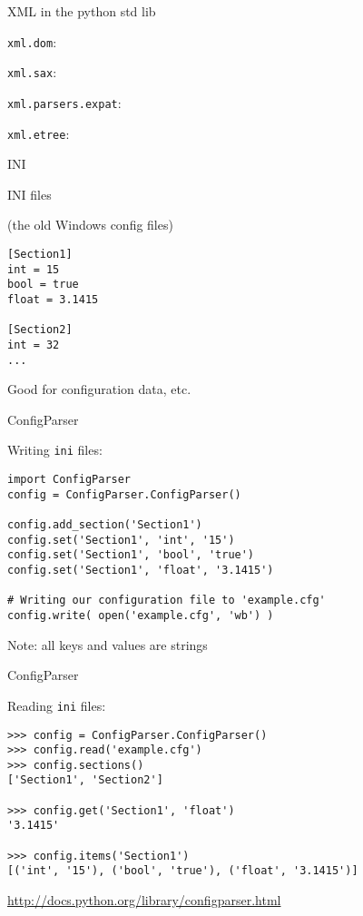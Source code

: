 \documentclass{beamer}
\begin{document}
\begin{frame}[fragile]{XML in the python std lib}


\vfill
{\Large \verb|xml.dom|: }

\vfill
{\Large \verb|xml.sax|: }

\vfill
{\Large \verb|xml.parsers.expat|: }

\vfill
{\Large \verb|xml.etree|: }


\end{frame} 

\begin{frame}[fragile]{INI}

{\Large INI files}

(the old Windows config files)

\begin{verbatim}
[Section1]
int = 15
bool = true
float = 3.1415

[Section2]
int = 32
...
\end{verbatim}
\vfill
{\Large Good for configuration data, etc.}
\end{frame}

\begin{frame}[fragile]{ConfigParser}

{\Large Writing \verb|ini| files:}

\begin{verbatim}
import ConfigParser
config = ConfigParser.ConfigParser()

config.add_section('Section1')
config.set('Section1', 'int', '15')
config.set('Section1', 'bool', 'true')
config.set('Section1', 'float', '3.1415')

# Writing our configuration file to 'example.cfg'
config.write( open('example.cfg', 'wb') )
\end{verbatim}

\vfill
Note: all keys and values are strings
\end{frame}

\begin{frame}[fragile]{ConfigParser}

{\Large Reading \verb|ini| files:}

\begin{verbatim}
>>> config = ConfigParser.ConfigParser()
>>> config.read('example.cfg')
>>> config.sections()
['Section1', 'Section2']

>>> config.get('Section1', 'float')
'3.1415'

>>> config.items('Section1')
[('int', '15'), ('bool', 'true'), ('float', '3.1415')]
\end{verbatim}

\vfill
\url{http://docs.python.org/library/configparser.html}
\end{frame}
\end{document}
